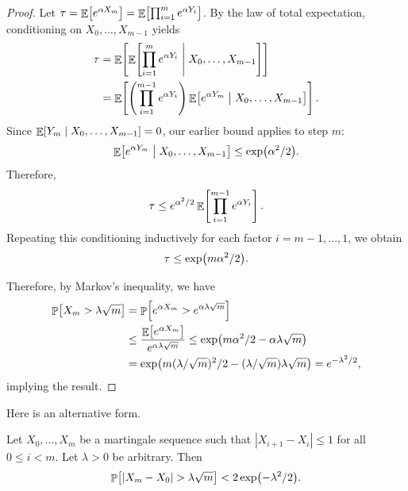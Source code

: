 \begin{proof}
    Let $\tau = \mathop{\mathbb{E}}\!\left[ {e^{\alpha X_m}} \right] = \mathop{\mathbb{E}}\!\left[ {\prod_{i=1}^{m} e^{\alpha Y_i}} \right]$.
    By the law of total expectation, conditioning on $X_0, \ldots, X_{m-1}$ yields
    \begin{align*}
        \tau
        &=
        \Ex{ \ExCond{ \prod_{i=1}^m e^{\alpha Y_i} }{ X_0, \ldots, X_{m-1} } }
        \\
        &=
        \Ex{ \pth{\prod_{i=1}^{m-1} e^{\alpha Y_i}}
             \ExCond{ e^{\alpha Y_m} }{ X_0, \ldots, X_{m-1} } }.
    \end{align*}
    Since $\mathop{\mathbb{E}}\!\left[ Y_m \;\middle\vert\; X_0, \ldots, X_{m-1} \right] = 0$, our earlier bound applies to step $m$:
    \begin{equation*}
        \ExCond{ e^{\alpha Y_m} }{ X_0, \ldots, X_{m-1} }
        \leq
        \exp\pth{\alpha^2/2}.
    \end{equation*}
    Therefore,
    \begin{equation*}
        \tau
        \leq
        e^{\alpha^2/2} \mathop{\mathbb{E}}\!\left[ { \prod_{i=1}^{m-1} e^{\alpha Y_i} } \right].
    \end{equation*}
    Repeating this conditioning inductively for each factor $i = m-1, \ldots, 1$, we obtain
    \begin{equation*}
        \tau
        \leq
        \exp\pth{m \alpha^2 / 2}.
    \end{equation*}

    Therefore, by Markov's inequality, we have
    \begin{align*}
        \Prob{ X_m > \lambda \sqrt{m}}%
        &=%
        \Prob{ e^{\alpha X_m} > e^{\alpha \lambda \sqrt{m}} } %
        \\ &%
        \leq%
        \frac{\Ex{e^{\alpha X_m}}}{e^{\alpha \lambda \sqrt{m}}}%
        \leq
        \exp\pth{m \alpha^2/2 -\alpha \lambda \sqrt{m}}
        \\ &%
        = \exp \pth{m
           (\lambda / \sqrt{m})^2/2 - (\lambda / \sqrt{m}) \lambda
           \sqrt{m}} = e^{-\lambda^2/2},
    \end{align*}
    implying the result.
\end{proof}

Here is an alternative form.

\begin{theorem}
    Let $ X_0, \ldots, X_m$ be a martingale sequence such
    that $|X_{i+1}-X_i| \leq 1$ for all $0 \leq i < m$.
    Let $\lambda > 0$ be arbitrary. Then
    \begin{equation*}
        \Prob{\cardin{X_m - X_0} > \lambda \sqrt{m}} <
        2\exp\pth{-\lambda^2/2}.
    \end{equation*}
\end{theorem}



